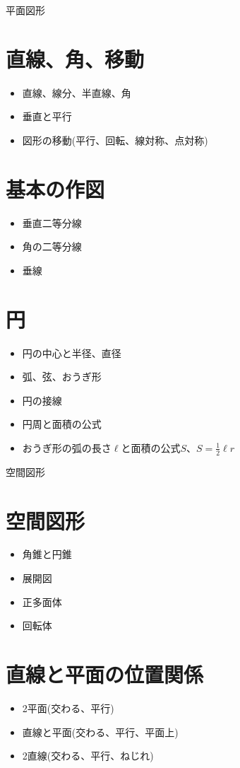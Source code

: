 \documentclass[11pt]{article}
\begin{document}
\newpage

{\LARGE \noindent 平面図形}

\section{直線、角、移動}
\begin{itemize}
\item 直線、線分、半直線、角
\item 垂直と平行
\item 図形の移動(平行、回転、線対称、点対称)
\end{itemize}

\section{基本の作図}
\begin{itemize}
\item 垂直二等分線
\item 角の二等分線
\item 垂線
\end{itemize}

\section{円}
\begin{itemize}
\item 円の中心と半径、直径
\item 弧、弦、おうぎ形
\item 円の接線
\item 円周と面積の公式
\item おうぎ形の弧の長さ$\ell$と面積の公式$S$、$S=\frac{1}{2} \ell r$
\end{itemize}

\newpage

{\LARGE \noindent 空間図形}
\section{空間図形}
\begin{itemize}
\item 角錐と円錐
\item 展開図
\item 正多面体
\item 回転体
\end{itemize}

\section{直線と平面の位置関係}
\begin{itemize}
\item 2平面(交わる、平行)
\item 直線と平面(交わる、平行、平面上)
\item 2直線(交わる、平行、ねじれ)
\end{itemize}
\end{document}
